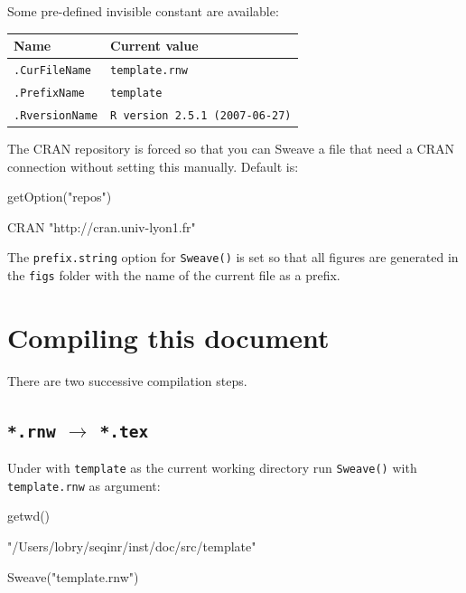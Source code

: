 \documentclass{article}
\begin{document}
\vspace{0.2cm}
Some pre-defined invisible \Rlogo{} constant are available:

\begin{tabular}{ll}
\hline \hline
Name & Current value\\
\hline
\texttt{.CurFileName} & \texttt{template.rnw}\\
\texttt{.PrefixName} & \texttt{template}\\
\texttt{.RversionName} & \texttt{R version 2.5.1 (2007-06-27)}\\
\hline \hline
\end{tabular}
\vspace{0.2cm}

The CRAN repository is forced so that you can Sweave a file that
need a CRAN connection without setting this manually. Default
is:

\begin{Schunk}
\begin{Sinput}
 getOption("repos")
\end{Sinput}
\begin{Soutput}
                       CRAN 
"http://cran.univ-lyon1.fr" 
\end{Soutput}
\end{Schunk}

\vspace{0.2cm}
The \texttt{prefix.string} option for \texttt{Sweave()} is set
so that all figures are generated in the \texttt{figs} folder with
the name of the current file as a prefix.

\section{Compiling this document}

There are two successive compilation steps.

\subsection{\texttt{*.rnw} $\rightarrow$ \texttt{*.tex}}

Under \Rlogo{} with \texttt{template} as the current working directory
run \texttt{Sweave()} with \texttt{template.rnw} as argument:

\begin{Schunk}
\begin{Sinput}
 getwd()
\end{Sinput}
\begin{Soutput}
[1] "/Users/lobry/seqinr/inst/doc/src/template"
\end{Soutput}
\end{Schunk}
\begin{Schunk}
\begin{Sinput}
 Sweave("template.rnw")
\end{Sinput}
\end{Schunk}
\end{document}
